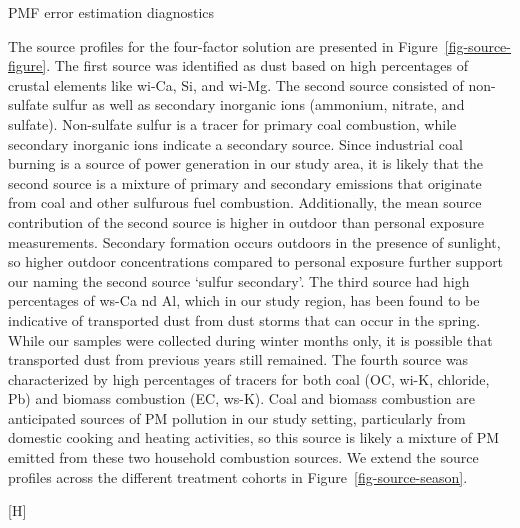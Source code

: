 \documentclass[
  letterpaper,
  DIV=11,
  numbers=noendperiod]{scrartcl}
\makeatletter
\renewenvironment{table}%
   {\renewcommand\familydefault\sfdefault
    \@float{table}}
   {\end@float}
\renewenvironment{figure}%
   {\renewcommand\familydefault\sfdefault
    \@float{figure}}
   {\end@float}
\makeatother
\begin{document}
\begin{table}

\caption{\label{tbl-pmf}PMF error estimation diagnostics}

\centering{

}

\end{table}%

The source profiles for the four-factor solution are presented in
Figure~\ref{fig-source-figure}. The first source was identified as dust
based on high percentages of crustal elements like wi-Ca, Si, and wi-Mg.
The second source consisted of non-sulfate sulfur as well as secondary
inorganic ions (ammonium, nitrate, and sulfate). Non-sulfate sulfur is a
tracer for primary coal combustion, while secondary inorganic ions
indicate a secondary source. Since industrial coal burning is a source
of power generation in our study area, it is likely that the second
source is a mixture of primary and secondary emissions that originate
from coal and other sulfurous fuel combustion. Additionally, the mean
source contribution of the second source is higher in outdoor than
personal exposure measurements. Secondary formation occurs outdoors in
the presence of sunlight, so higher outdoor concentrations compared to
personal exposure further support our naming the second source `sulfur
secondary'. The third source had high percentages of ws-Ca nd Al, which
in our study region, has been found to be indicative of transported dust
from dust storms that can occur in the spring. While our samples were
collected during winter months only, it is possible that transported
dust from previous years still remained. The fourth source was
characterized by high percentages of tracers for both coal (OC, wi-K,
chloride, Pb) and biomass combustion (EC, ws-K). Coal and biomass
combustion are anticipated sources of PM pollution in our study setting,
particularly from domestic cooking and heating activities, so this
source is likely a mixture of PM emitted from these two household
combustion sources. We extend the source profiles across the different
treatment cohorts in Figure~\ref{fig-source-season}.

\begin{figure}[H]


\caption{\label{fig-source-figure}Source profiles for the 4-factor PMF
solution to the sum of elements, ions, elemental carbon, and organic
carbon for outdoor and personal PM\textsubscript{2.5} exposure
measurements. The lines separate the major contributing species to each
source}

\end{figure}%
\end{document}
